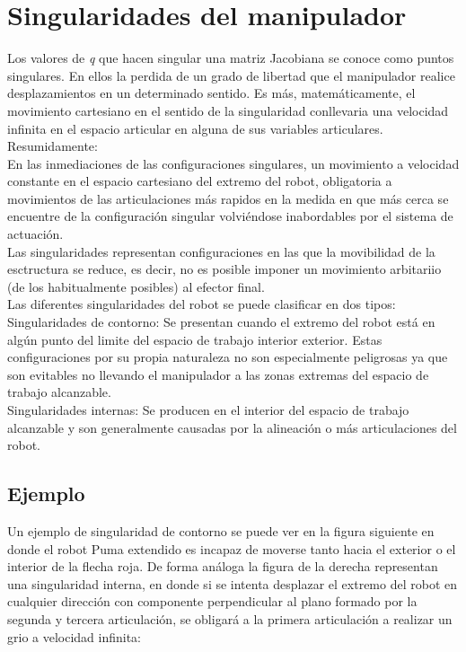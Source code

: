 \documentclass[letter,openright,12pt,spanish]{report}
\begin{document}
\section{Singularidades del manipulador}

Los valores de \textit{q} que hacen singular una matriz Jacobiana se conoce como puntos singulares. En ellos la perdida de un grado de libertad que el manipulador realice desplazamientos en un determinado sentido. Es m\'as, matem\'aticamente, el movimiento cartesiano en el sentido de la singularidad conllevaria una velocidad infinita en el espacio articular en alguna de sus variables articulares.\\
Resumidamente:\\

En las inmediaciones de las configuraciones singulares, un movimiento a velocidad constante en el espacio cartesiano del extremo del robot, obligatoria a movimientos de las articulaciones m\'as rapidos en la medida en que m\'as cerca se encuentre de la configuraci\'on singular volvi\'endose inabordables por el sistema de actuaci\'on.\\

Las singularidades representan configuraciones en las que la movibilidad de la esctructura se reduce, es decir, no es posible imponer un movimiento arbitariio (de los habitualmente posibles) al efector final.\\

Las diferentes singularidades del robot se puede clasificar en dos tipos:\\

Singularidades de contorno: Se presentan cuando el extremo del robot est\'a en alg\'un punto del limite del espacio de trabajo interior exterior. Estas configuraciones por su propia naturaleza no son especialmente peligrosas ya que son evitables no llevando el manipulador a las zonas extremas del espacio de trabajo alcanzable.\\

Singularidades internas: Se producen en el interior del espacio de trabajo alcanzable y son generalmente causadas por la alineaci\'on o m\'as articulaciones del robot.\\

\subsection{Ejemplo}

Un ejemplo de singularidad de contorno se puede ver en la figura siguiente en donde el robot Puma extendido es incapaz de moverse tanto hacia el exterior o el interior de la flecha roja. De forma an\'aloga la figura de la derecha representan una singularidad interna, en donde si se intenta desplazar el extremo del robot en cualquier direcci\'on con componente perpendicular al plano formado por la segunda y tercera articulaci\'on, se obligar\'a a la primera articulaci\'on a realizar un grio a velocidad infinita:\\
\end{document}
